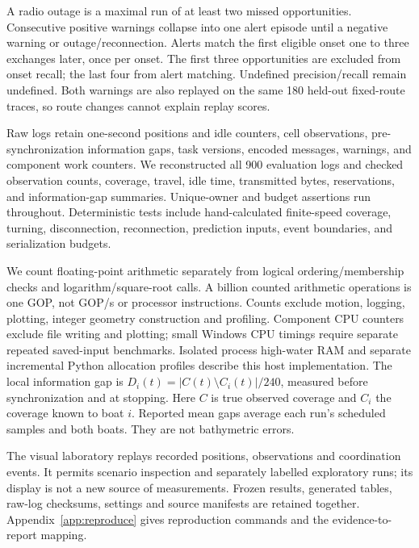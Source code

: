 A radio outage is a maximal run of at least two missed opportunities. Consecutive positive warnings collapse into one alert episode until a negative warning or outage/reconnection. Alerts match the first eligible onset one to three exchanges later, once per onset. The first three opportunities are excluded from onset recall; the last four from alert matching. Undefined precision/recall remain undefined. Both warnings are also replayed on the same 180 held-out fixed-route traces, so route changes cannot explain replay scores.

Raw logs retain one-second positions and idle counters, cell observations, pre-synchronization information gaps, task versions, encoded messages, warnings, and component work counters. We reconstructed all 900 evaluation logs and checked observation counts, coverage, travel, idle time, transmitted bytes, reservations, and information-gap summaries. Unique-owner and budget assertions run throughout. Deterministic tests include hand-calculated finite-speed coverage, turning, disconnection, reconnection, prediction inputs, event boundaries, and serialization budgets.

We count floating-point arithmetic separately from logical ordering/membership checks and logarithm/square-root calls. A billion counted arithmetic operations is one GOP, not GOP/s or processor instructions. Counts exclude motion, logging, plotting, integer geometry construction and profiling. Component CPU counters exclude file writing and plotting; small Windows CPU timings require separate repeated saved-input benchmarks. Isolated process high-water RAM and separate incremental Python allocation profiles describe this host implementation. The local information gap is $D_i(t)=|C(t)\setminus C_i(t)|/240$, measured before synchronization and at stopping. Here $C$ is true observed coverage and $C_i$ the coverage known to boat $i$. Reported mean gaps average each run's scheduled samples and both boats. They are not bathymetric errors.

The visual laboratory replays recorded positions, observations and coordination events. It permits scenario inspection and separately labelled exploratory runs; its display is not a new source of measurements. Frozen results, generated tables, raw-log checksums, settings and source manifests are retained together. Appendix~\ref{app:reproduce} gives reproduction commands and the evidence-to-report mapping.

